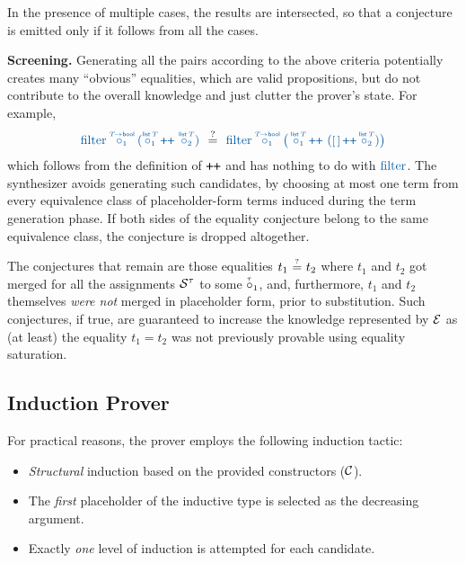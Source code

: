 In the presence of multiple cases, the results are intersected, so that a conjecture is emitted only if it follows from all the cases.

\begin{comment}  %
The two terms on the top row will not be merged. This is because,
for example, for the valuation $\big\{
    \pholder{1}{\tlist\,T}\mapsto[], 
    \pholder{2}{\tlist\,T}\mapsto l_1,
    \pholder{2}{T~}\mapsto v_1
\big\}$,
The left one expands to $[]$ whereas the right expands to $l_1$.
\end{comment}

\begin{paragraph}{\bf Screening.}
Generating all the pairs according to the above criteria potentially creates many ``obvious'' equalities, which are valid propositions, but do not contribute to the overall knowledge and just clutter the prover's state.
For example,
\[
{\clrterm
\tfilter\pholder{1}{T\!\to\tbool}
 ({\pholder{1}{\tlist\,T}} \concat\, {\pholder{2}{\tlist\,T}})} ~\maybeEq~
{\clrterm
\tfilter\pholder{1}{T\!\to\tbool}
  \big(\,{\pholder{1}{\tlist\,T}} \concat\,
  {(\lnil \concat {\pholder{2}{\tlist\,T}})}\big)}
\]
which follows from the definition of ${\concat}$ and has nothing to do with
$\clrterm\tfilter$. 
The synthesizer avoids generating such candidates, by
choosing at most one term from every equivalence class
of placeholder-form terms induced during the term generation phase.
If both sides of the equality conjecture belong to the same equivalence class, the conjecture is dropped altogether.
\end{paragraph}

The conjectures that remain are those equalities $t_1\operatorname{\overset{\scriptscriptstyle ?}{\,=\,}} t_2$ where $t_1$ and $t_2$ got merged for all the assignments $\mathcal{S}^{\tau}$ to some $\pholder{1}{\tau~\,}$, and, furthermore, $t_1$ and $t_2$ themselves \emph{were not} merged in placeholder form,
prior to substitution.
Such conjectures, if true, are guaranteed to increase the knowledge represented by $\mathcal{E}$ as (at least) the equality $t_1=t_2$ was not previously provable using equality saturation.

\subsection{Induction Prover}
\label{overview:induction}

For practical reasons, the prover employs the following induction tactic:
\begin{itemize}
  \item \emph{Structural} induction based on the provided 
    constructors ($\mathcal{C}$).
  \item The \emph{first} placeholder of the inductive type is selected as the decreasing argument.
   \item Exactly \emph{one} level of induction is attempted for each candidate.
\end{itemize}

